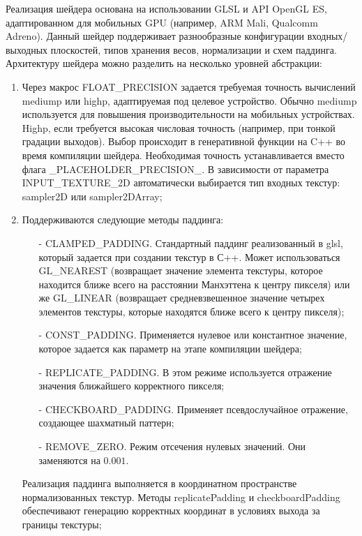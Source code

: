 \documentclass[a4paper,14pt]{extreport}
\begin{document}
            Реализация шейдера основана на использовании GLSL и API OpenGL ES, адаптированном для мобильных GPU (например, ARM Mali, Qualcomm Adreno). Данный шейдер поддерживает разнообразные конфигурации входных/выходных плоскостей, типов хранения весов, нормализации и схем паддинга. Архитектуру шейдера можно разделить на несколько уровней абстракции:
            \begin{enumerate}
                \item Через макрос FLOAT\_PRECISION задается требуемая точность вычислений mediump или highp, адаптируемая под целевое устройство. Обычно mediump используется для повышения производительности на мобильных устройствах. Highp, если требуется высокая числовая точность (например, при тонкой градации выходов). Выбор происходит в генеративной функции на C++ во время компиляции шейдера. Необходимая точность устанавливается вместо флага \_PLACEHOLDER\_PRECISION\_. В зависимости от параметра INPUT\_TEXTURE\_2D автоматически выбирается тип входных текстур: sampler2D или sampler2DArray;
                
                
                \item Поддерживаются следующие методы паддинга:
                    \begin{itemize}
                        \item[-] CLAMPED\_PADDING. Стандартный паддинг реализованный в glsl, который задается при создании текстур в С++. Может использоваться GL\_NEAREST (возвращает значение элемента текстуры, которое находится ближе всего на расстоянии Манхэттена к центру пикселя) или же GL\_LINEAR (возвращает средневзвешенное значение четырех элементов текстуры, которые находятся ближе всего к центру  пикселя);
                        \item[-] CONST\_PADDING. Применяется нулевое или константное значение, которое задается как параметр на этапе компиляции шейдера;
                        \item[-] REPLICATE\_PADDING. В этом режиме используется отражение значения ближайшего корректного пикселя;
                        \item[-] CHECKBOARD\_PADDING. Применяет псевдослучайное отражение, создающее шахматный паттерн;
                        \item[-] REMOVE\_ZERO. Режим отсечения нулевых значений. Они заменяются на $0.001$.
                    \end{itemize}
                
                Реализация паддинга выполняется в координатном пространстве нормализованных текстур. Методы replicatePadding и checkboardPadding обеспечивают генерацию корректных координат в условиях выхода за границы текстуры;
                

\end{enumerate}
\end{document}

